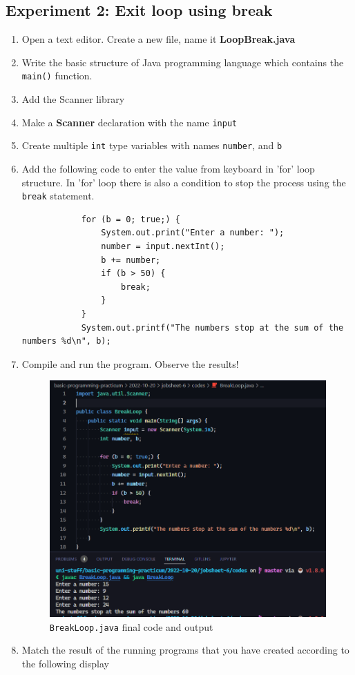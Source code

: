 \documentclass[12pt,titlepage]{article}
\begin{document}
\subsection{Experiment 2: Exit loop using break}
\begin{enumerate}
    \item Open a text editor. Create a new file, name it \textbf{LoopBreak.java}
    \item Write the basic structure of Java programming language which contains the \texttt{main()} function.
    \item Add the Scanner library
    \item Make a \textbf{Scanner} declaration with the name \texttt{input}
    \item Create multiple \texttt{int} type variables with names \texttt{number}, and \texttt{b}
    \item {
        Add the following code to enter the value from keyboard in 'for' loop structure.
        In 'for' loop there is also a condition to stop the process using the \texttt{break} statement.

        \begin{verbatim}
            for (b = 0; true;) {
                System.out.print("Enter a number: ");
                number = input.nextInt();
                b += number;
                if (b > 50) {
                    break;
                }
            }
            System.out.printf("The numbers stop at the sum of the numbers %d\n", b);
        \end{verbatim}
    }
    \pagebreak
    \item {
        Compile and run the program. Observe the results!

        \begin{figure}[h]
            \centering
            \includegraphics[width=.9\textwidth]{./images/break-loop.png}
            \caption{\texttt{BreakLoop.java} final code and output}
        \end{figure}
    }
    \item {
        Match the result of the running programs that you have created according to the following display

}
\end{enumerate}
\end{document}
